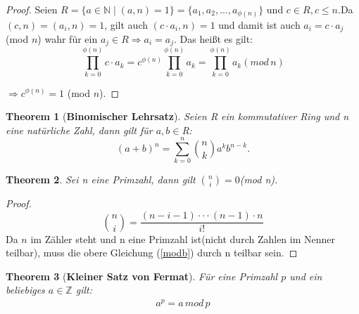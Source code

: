 \documentclass[12pt,oneside]{article}
\newtheorem{theorem}{Theorem}[section]
\theoremstyle{remark}
\theoremstyle{definition}
\begin{document}
\begin{proof}
    
Seien $R =\{ a \in \mathbb{N} \mid (a,n) = 1 \} =  \{a_{1}, a_{2},...,a_{\phi(n)} \}$ und $c \in R, c \leq n$.\newline\newline Da $(c,n) = (a_{i},n) = 1$, gilt auch $(c \cdot a_{i}, n) = 1$ \newline\newline und damit ist auch $a_{i} = c \cdot a_{j}$(mod $n$) wahr für ein $a_{j} \in R \Rightarrow a_{i} = a_{j}$. Das heißt es gilt:\newline
\begin{equation}
     \prod_{k = 0}^{\phi(n)} c \cdot a_{k} =
     c^{\phi(n)}\prod_{k = 0}^{\phi(n)} a_{k} = \prod_{k = 0}^{\phi(n)}  a_{k} (mod \, n )
\end{equation}
    
     $\Rightarrow c^{\phi(n)} = 1$ (mod $n$).

\end{proof}

\smallskip

\begin{theorem}[\textbf{Binomischer Lehrsatz}]\label{Th_3}
Seien R ein kommutativer Ring und n eine natürliche Zahl, dann gilt für $a,b \in $R:\newline\newline
 \begin{equation}
     (a + b)^n  = \sum_{k=0}^n {n \choose k} a^k b^{n-k}.
 \end{equation}
\end{theorem}

\smallskip

\begin{theorem}\label{th_25}
Sei n eine Primzahl, dann gilt ${n \choose i} = 0 $(mod n).
\end{theorem}

\begin{proof}
\begin{equation}\label{modb}
    {n \choose i} = \frac{(n - i - 1) \cdot \cdot \cdot (n - 1) \cdot n }{i!}
\end{equation}
Da $n$ im Zähler steht und n eine Primzahl ist(nicht durch Zahlen im Nenner teilbar), muss die obere Gleichung (\ref{modb}) durch n teilbar sein. 
\end{proof}

\smallskip

\begin{theorem}[\textbf{Kleiner Satz von Fermat}]\label{Th_2}
Für eine Primzahl $p$ und ein beliebiges $a \in \mathbb{Z}$ gilt:
\begin{align*}
    a^p = a \, mod \, p
\end{align*}
\end{theorem}
\end{document}
